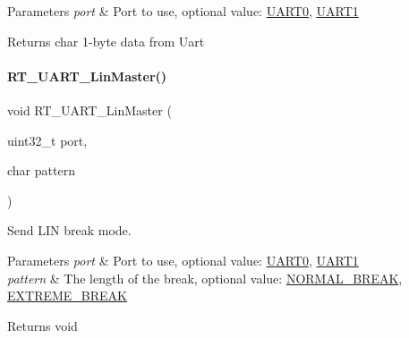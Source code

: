 \begin{DoxyParams}{Parameters}
{\em port} & Port to use, optional value\+: \mbox{\hyperlink{a00056_a0508661f121639ffdee7de2353a0def2}{U\+A\+R\+T0}}, \mbox{\hyperlink{a00056_a8d69bf04d07af4fbbab5a8bd291f65ff}{U\+A\+R\+T1}} \\
\hline
\end{DoxyParams}
\begin{DoxyReturn}{Returns}
char 1-\/byte data from Uart 
\end{DoxyReturn}
\mbox{\label{a00056_ab0faf051e642e540b1b9c114eae242bd}} 
\paragraph{\texorpdfstring{R\+T\+\_\+\+U\+A\+R\+T\+\_\+\+Lin\+Master()}{RT\_UART\_LinMaster()}}
{\footnotesize\ttfamily void R\+T\+\_\+\+U\+A\+R\+T\+\_\+\+Lin\+Master (\begin{DoxyParamCaption}\item[{uint32\+\_\+t}]{port,  }\item[{char}]{pattern }\end{DoxyParamCaption})}



Send L\+IN break mode. 


\begin{DoxyParams}{Parameters}
{\em port} & Port to use, optional value\+: \mbox{\hyperlink{a00056_a0508661f121639ffdee7de2353a0def2}{U\+A\+R\+T0}}, \mbox{\hyperlink{a00056_a8d69bf04d07af4fbbab5a8bd291f65ff}{U\+A\+R\+T1}} \\
\hline
{\em pattern} & The length of the break, optional value\+: \mbox{\hyperlink{a00056_a7d77cd41951b1fe6b0874924df2bf689}{N\+O\+R\+M\+A\+L\+\_\+\+B\+R\+E\+AK}}, \mbox{\hyperlink{a00056_a7c76b3ed72795f2085873ee332fdab1b}{E\+X\+T\+R\+E\+M\+E\+\_\+\+B\+R\+E\+AK}} \\
\hline
\end{DoxyParams}
\begin{DoxyReturn}{Returns}
void 
\end{DoxyReturn}
\mbox{\label{a00056_ab03e9e1a8d4d9b97583db27174086108}} 
